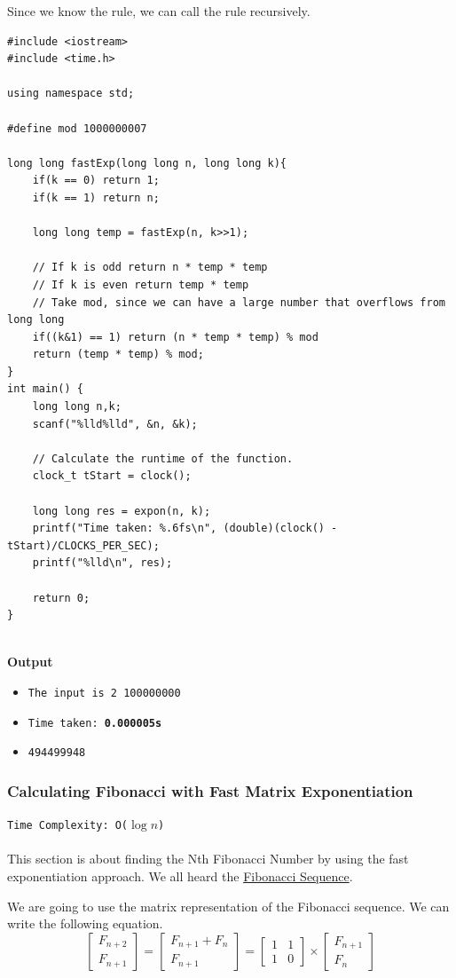 \documentclass[12pt]{article}
\begin{document}
Since we know the rule, we can call the rule recursively.
\begin{verbatim}
#include <iostream>
#include <time.h>

using namespace std;

#define mod 1000000007

long long fastExp(long long n, long long k){
    if(k == 0) return 1;
    if(k == 1) return n;
    
    long long temp = fastExp(n, k>>1);
    
    // If k is odd return n * temp * temp
    // If k is even return temp * temp
    // Take mod, since we can have a large number that overflows from long long
    if((k&1) == 1) return (n * temp * temp) % mod
    return (temp * temp) % mod;
}
int main() {
    long long n,k;
    scanf("%lld%lld", &n, &k);
    
    // Calculate the runtime of the function.
    clock_t tStart = clock();
    
    long long res = expon(n, k);
    printf("Time taken: %.6fs\n", (double)(clock() - tStart)/CLOCKS_PER_SEC);
    printf("%lld\n", res);
    
    return 0;
}


\end{verbatim}
\textbf{Output}

\begin{itemize}
  \item \texttt{The input is 2 100000000} 
  \item \texttt{Time taken: \textbf{0.000005s}} 
  \item \texttt{494499948}
\end{itemize}

\subsubsection{Calculating Fibonacci with Fast Matrix Exponentiation}
\texttt{Time Complexity: O($\log{n}$) } \\ \\
This section is about finding the Nth Fibonacci Number by using the fast exponentiation approach. We all heard the \href{https://en.wikipedia.org/wiki/Fibonacci_number}{Fibonacci Sequence}. 

We are going to use the matrix representation of the Fibonacci sequence. We can write the following equation. \cite{fibonaccimatrix}
\[
\begin{bmatrix}
    F_{n+2} \\
    F_{n+1}
\end{bmatrix}
=
\begin{bmatrix}
    F_{n+1} + F_{n}\\
    F_{n+1}
\end{bmatrix}
=
\begin{bmatrix}
    1 & 1  \\
    1 & 0
\end{bmatrix}
\times
\begin{bmatrix}
    F_{n+1} \\
    F_{n}
\end{bmatrix}
\]
\end{document}
